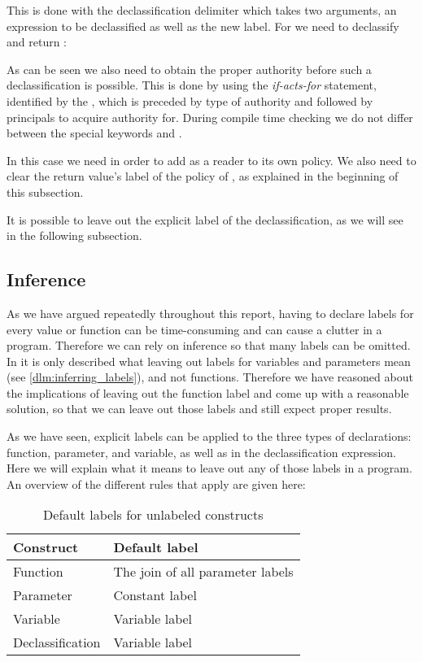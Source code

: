 This is done with the declassification delimiter \dlmc{<| |>} which takes two arguments, an expression to be declassified as well as the new label.
For  we need to declassify and return :\\
\begin{minipage}{\linewidth}

\end{minipage}

As can be seen we also need to obtain the proper authority before such a declassification is possible.
This is done by using the \emph{if-acts-for} statement, identified by the , which is preceded by type of authority and followed by principals to acquire authority for.
During compile time checking we do not differ between the special keywords  and .

In this case we need  in order to add  as a reader to its own policy.
We also need to clear the return value's label of the policy of , as explained in the beginning of this subsection.

It is possible to leave out the explicit label of the declassification, as we will see in the following subsection.

\subsection{Inference}
As we have argued repeatedly throughout this report, having to declare labels for every value or function can be time-consuming and can cause a clutter in a program.
Therefore we can rely on inference so that many labels can be omitted.
In \cite{myers1997} it is only described what leaving out labels for variables and parameters mean (see \cref{dlm:inferring_labels}), and not functions.
Therefore we have reasoned about the implications of leaving out the function label and come up with a reasonable solution, so that we can leave out those labels and still expect proper results.

As we have seen, explicit labels can be applied to the three types of declarations: function, parameter, and variable, as well as in the declassification expression.
Here we will explain what it means to leave out any of those labels in a program.
An overview of the different rules that apply are given here:
\begin{table}[H]
  \begin{tabularx}{\textwidth}{|l|X|}
    \hline
    \textbf{Construct} & \textbf{Default label} \\ \hline \hline
    Function & The join of all parameter labels \\ \hline
    Parameter & Constant label \\ \hline
    Variable & Variable label \\ \hline
    Declassification & Variable label \\ \hline
  \end{tabularx}
  \caption{Default labels for unlabeled constructs}
  \label{informal:table:default_labels}
\end{table}

